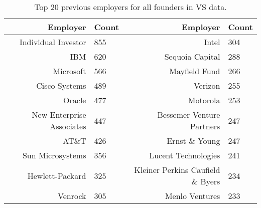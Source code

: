 \begin{table}[]
\centering
\begingroup\normalsize
\begin{tabular}{rlrl}
  \toprule
Employer & Count & Employer & Count \\ 
  \midrule
Individual Investor & 855 & Intel & 304 \\ 
  IBM & 620 & Sequoia Capital & 288 \\ 
  Microsoft & 566 & Mayfield Fund & 266 \\ 
  Cisco Systems & 489 & Verizon & 255 \\ 
  Oracle & 477 & Motorola & 253 \\ 
  New Enterprise Associates & 447 & Bessemer Venture Partners & 247 \\ 
  AT\&T & 426 & Ernst \& Young & 247 \\ 
  Sun Microsystems & 356 & Lucent Technologies & 241 \\ 
  Hewlett-Packard & 325 & Kleiner Perkins Caufield \& Byers & 234 \\ 
  Venrock & 305 & Menlo Ventures & 233 \\ 
   \bottomrule
\end{tabular}
\endgroup
\caption{Top 20 previous employers for all founders in VS data.} 
\label{table:VS_previousEmployersNoPositionsSummaryTable}
\end{table}
